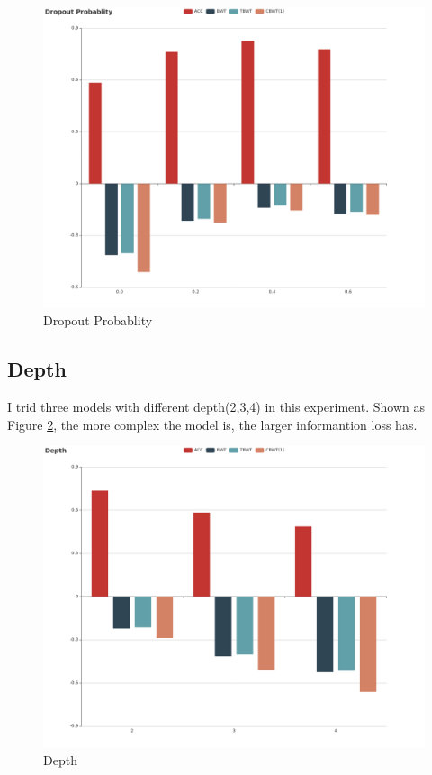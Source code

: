 \documentclass{article}
\begin{document}
\begin{figure}[htbp]
\centering
\includegraphics[scale=0.3]{img/DropoutProbablity.png}
\caption{Dropout Probablity}
\label{dropout}
\end{figure}

\subsection{Depth}
I trid three models with different depth(2,3,4) in this experiment. Shown as Figure \ref{depth}, the more complex the model is, the larger informantion loss has.

\begin{figure}[htbp]
\centering
\includegraphics[scale=0.3]{img/Depth.png}
\caption{Depth}
\label{depth}
\end{figure}
\end{document}
